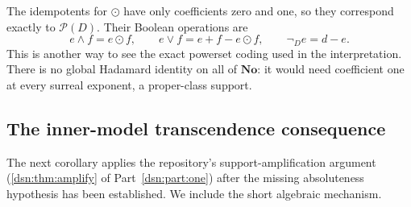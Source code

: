 \documentclass[11pt,a4paper]{article}
\numberwithin{equation}{section}
\theoremstyle{definition}
\theoremstyle{remark}
\newcommand{\No}{\mathbf{No}}
\begin{document}
The idempotents for \(\odot\) have only coefficients zero and one, so
they correspond exactly to \(\mathcal P(D)\).  Their Boolean operations
are
\[
 e\wedge f=e\odot f,\qquad e\vee f=e+f-e\odot f,
 \qquad \neg_D e=d-e.
\]
This is another way to see the exact powerset coding used in the
interpretation.  There is no global Hadamard identity on all of \(\No\):
it would need coefficient one at every surreal exponent, a proper-class
support.

\subsection{The inner-model transcendence consequence}

The next corollary applies the repository's support-amplification argument
(\cref{dsn:thm:amplify} of Part~\ref{dsn:part:one}) after the missing absoluteness hypothesis has
been established.  We include the short algebraic mechanism.
\end{document}
